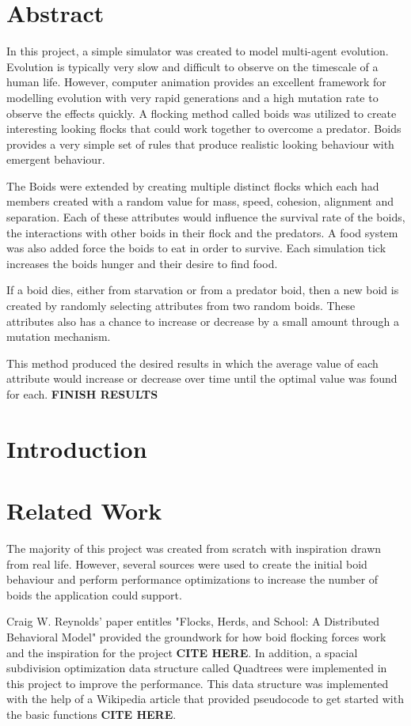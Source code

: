 \documentclass{egpubl}
\begin{document}
\section{Abstract}
In this project, a simple simulator was created to model multi-agent evolution. Evolution is typically very slow and difficult to observe on the timescale of a human life. However, computer animation provides an excellent framework for modelling evolution with very rapid generations and a high mutation rate to observe the effects quickly. A flocking method called boids was utilized to create interesting looking flocks that could work together to overcome a predator. Boids provides a very simple set of rules that produce realistic looking behaviour with emergent behaviour.
\par
The Boids were extended by creating multiple distinct flocks which each had members created with a random value for mass, speed, cohesion, alignment and separation. Each of these attributes would influence the survival rate of the boids, the interactions with other boids in their flock and the predators. A food system was also added force the boids to eat in order to survive. Each simulation tick increases the boids hunger and their desire to find food.
\par
If a boid dies, either from starvation or from a predator boid, then a new boid is created by randomly selecting attributes from two random boids. These attributes also has a chance to increase or decrease by a small amount through a mutation mechanism.
\par
This method produced the desired results in which the average value of each attribute would increase or decrease over time until the optimal value was found for each. \textbf{FINISH RESULTS} 
\section{Introduction}
\section{Related Work}
The majority of this project was created from scratch with inspiration drawn from real life. However, several sources were used to create the initial boid behaviour and perform performance optimizations to increase the number of boids the application could support.
\par
Craig W. Reynolds' paper entitles "Flocks, Herds, and School: A Distributed Behavioral Model" provided the groundwork for how boid flocking forces work and the inspiration for the project \textbf{CITE HERE}. In addition, a spacial subdivision optimization data structure called Quadtrees were implemented in this project to improve the performance. This data structure was implemented with the help of a Wikipedia article that provided pseudocode to get started with the basic functions \textbf{CITE HERE}.
\end{document}
